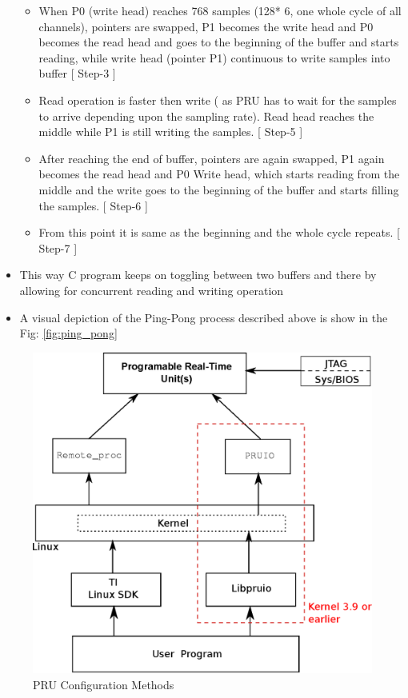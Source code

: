 \begin{itemize}
\begin{itemize}
		
		\item When P0 (write head) reaches 768 samples (128* 6, one whole cycle of all channels), pointers are swapped, P1 becomes the write head and P0 becomes the read head and goes to the beginning of the buffer and starts reading, while write head (pointer P1) continuous to write samples into buffer [ Step-3 ]
		\item Read operation is faster then write ( as PRU has to wait for the samples to arrive depending upon the sampling rate). Read head reaches the middle while P1 is still writing the samples. [ Step-5 ]
		\item After reaching the end of buffer, pointers are again swapped, P1 again becomes the read head and P0 Write head, which starts reading from the middle and the write goes to the beginning of the buffer and starts filling the samples. [ Step-6 ]
		\item From this point it is same as the beginning and the whole cycle repeats. [ Step-7 ]
	\end{itemize} 
	\item This way C program keeps on toggling between two buffers and there by allowing for concurrent reading and writing operation
	\item A visual depiction of the Ping-Pong process described above is show in the Fig: \ref{fig:ping_pong}
\end{itemize}

\begin{figure}[h]
	\includegraphics[width=\textwidth]{fig/PRU_config.eps}
	\caption{PRU Configuration Methods}
	\label{fig:pru_config}
\end{figure}


